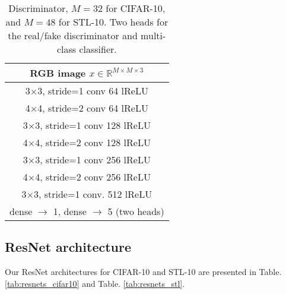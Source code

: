 \documentclass{article}
\newcommand{\bbR}{\mathbb{R}}
\begin{document}
\begin{table}[ht!]
    \begin{subtable}{.32\linewidth}
    	\centering
    	{\begin{tabular}{c}
			\toprule
			\midrule
		 	RGB image $x\in \bbR^{M\times M \times 3}$ \\
			\midrule
            3$\times$3, stride=1 conv 64 lReLU\\
            4$\times$4, stride=2 conv 64 lReLU\\
            \midrule
            3$\times$3, stride=1 conv 128 lReLU\\
            4$\times$4, stride=2 conv 128 lReLU\\
            \midrule
            3$\times$3, stride=1 conv 256 lReLU\\
            4$\times$4, stride=2 conv 256 lReLU\\
            \midrule
            3$\times$3, stride=1 conv. 512 lReLU\\
            \midrule
            dense $\rightarrow$ 1, dense $\rightarrow$ 5 (two heads)\\
			\bottomrule
		\end{tabular}}
        \caption{\label{tab:dis_deep}Discriminator, $M=32$ for CIFAR-10, and $M=48$ for STL-10. Two heads for the real/fake discriminator and multi-class classifier.}
    \end{subtable}
\end{table}

\subsection{ResNet architecture}

Our ResNet architectures for CIFAR-10 and STL-10 are presented in Table. \ref{tab:resnets_cifar10} and Table. \ref{tab:resnets_stl}.
\end{document}
